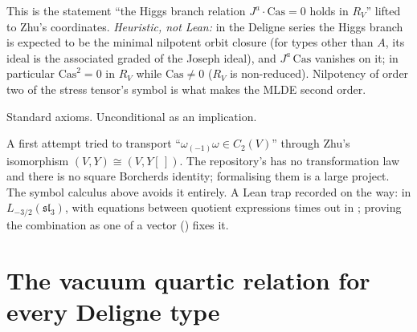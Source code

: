 \begin{physics}
This is the statement ``the Higgs branch relation $J^a\cdot\mathrm{Cas}=0$ holds in $R_V$'' lifted to Zhu's
coordinates. \emph{Heuristic, not Lean:} in the Deligne series the Higgs branch is expected to be the minimal
nilpotent orbit closure (for types other than $A$, its ideal is the associated graded of the Joseph ideal), and
$J^a\,\mathrm{Cas}$ vanishes on it; in particular $\mathrm{Cas}^2=0$ in $R_V$ while $\mathrm{Cas}\ne0$ ($R_V$ is
non-reduced). Nilpotency of order two of the stress tensor's symbol is what makes the MLDE second order.
\end{physics}
\begin{status}
Standard axioms. Unconditional as an implication.
\end{status}

\begin{warning}[title={Dead end: Zhu's change of coordinates as a VOA isomorphism}]
A first attempt tried to transport ``$\omega_{(-1)}\omega\in C_2(V)$'' through Zhu's isomorphism
$(V,Y)\cong(V,Y[\,])$. The repository's  has no transformation law and there is no square Borcherds
identity; formalising them is a large project. The symbol calculus above avoids it entirely. A Lean trap recorded
on the way: in $L_{-3/2}(\mathfrak{sl}_3)$,  with equations between quotient expressions times out in
; proving the combination as one  of a vector () fixes it.
\end{warning}

\section{The vacuum quartic relation for every Deligne type}\label{l25:sec:alltypes}


